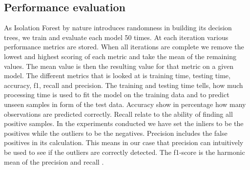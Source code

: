 \subsection{Performance evaluation}
As Isolation Forest by nature introduces randomness in building its decision trees, we train and evaluate each model 50 times. At each iteration various performance metrics are stored. When all iterations are complete we remove the lowest and highest scoring of each metric and take the mean of the remaining values. The mean value is then the resulting value for that metric on a given model. The different metrics that is looked at is training time, testing time, accuracy, f1, recall and precision. The training and testing time tells, how much processing time is used to fit the model on the training data and to predict unseen samples in form of the test data. Accuracy show in percentage how many observations are predicted correctly. Recall relate to the ability of finding all positive samples. In the experiments conducted we have set the inliers to be the positives while the outliers to be the negatives. Precision includes the false positives in its calculation. This means in our case that precision can intuitively be used to see if the outliers are correctly detected. The f1-score is the harmonic mean of the precision and recall \cite{sklearn}.                 



